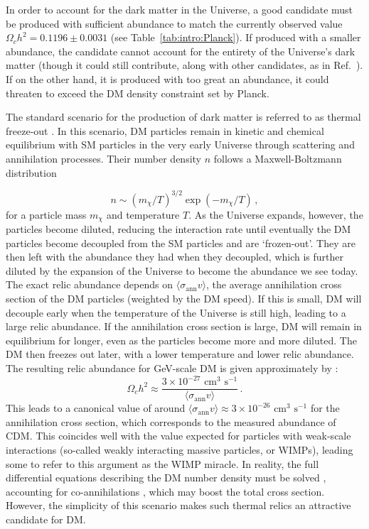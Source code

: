 In order to account for the dark matter in the Universe, a good candidate must be produced with sufficient abundance to match the currently observed value $\Omega_c h^2 = 0.1196 \pm 0.0031$ (see Table~\ref{tab:intro:Planck}). If produced with a smaller abundance, the candidate cannot account for the entirety of the Universe's dark matter (though it could still contribute, along with other candidates, as in Ref.~\cite{Feldman:2010}). If on the other hand, it is produced with too great an abundance, it could threaten to exceed the DM density constraint set by Planck.

The standard scenario for the production of dark matter is referred to as thermal freeze-out \cite{Kolb:1990}. In this scenario, DM particles remain in kinetic and chemical equilibrium with SM particles in the very early Universe through scattering and annihilation processes. Their number density $n$ follows a Maxwell-Boltzmann distribution

\begin{equation}
n \sim (m_\chi/T)^{3/2} \exp(-m_\chi/T)\,,
\end{equation}
for a particle mass $m_\chi$ and temperature $T$. As the Universe expands, however, the particles become diluted, reducing the interaction rate until eventually the DM particles become decoupled from the SM particles and are `frozen-out'. They are then left with the abundance they had when they decoupled, which is further diluted by the expansion of the Universe to become the abundance we see today. The exact relic abundance depends on $\langle \sigma_\mathrm{ann} v\rangle$, the average annihilation cross section of the DM particles (weighted by the DM speed). If this is small, DM will decouple early when the temperature of the Universe is still high, leading to a large relic abundance. If the annihilation cross section is large, DM will remain in equilibrium  for longer, even as the particles become more and more diluted. The DM then freezes out later, with a lower temperature and lower relic abundance. The resulting relic abundance for GeV-scale DM is given approximately by \cite{Kolb:1990}:
\begin{equation}
\Omega_c h^2 \approx \frac{3 \times 10^{-27} \textrm{ cm}^{3} \textrm{ s}^{-1}}{\langle \sigma_\mathrm{ann} v \rangle}\,.
\end{equation}
This leads to a canonical value of around $\langle \sigma_\mathrm{ann} v \rangle \approx 3 \times 10^{-26} \textrm{ cm}^{3} \textrm{ s}^{-1}$ for the annihilation cross section, which corresponds to the measured abundance of CDM. This coincides well with the value expected for particles with weak-scale interactions (so-called weakly interacting massive particles, or WIMPs), leading some to refer to this argument as the WIMP miracle. In reality, the full differential equations describing the DM number density must be solved \cite{Gelmini:2010}, accounting for co-annihilations \cite{Griest:1991}, which may boost the total cross section. However, the simplicity of this scenario makes such thermal relics an attractive candidate for DM.

